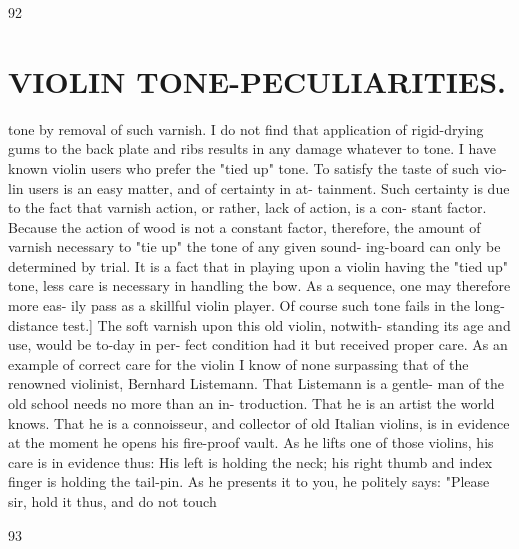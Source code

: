 \documentclass{article}
\begin{document}
92

\section*{VIOLIN TONE-PECULIARITIES.}
tone by removal of such varnish. I do not find that application of rigid-drying gums to the back plate and ribs results in any damage whatever to tone. I have known violin users who prefer the "tied up" tone. To satisfy the taste of such vio- lin users is an easy matter, and of certainty in at- tainment. Such certainty is due to the fact that varnish action, or rather, lack of action, is a con- stant factor. Because the action of wood is not a constant factor, therefore, the amount of varnish necessary to "tie up" the tone of any given sound- ing-board can only be determined by trial. It is a fact that in playing upon a violin having the "tied up" tone, less care is necessary in handling the bow. As a sequence, one may therefore more eas- ily pass as a skillful violin player. Of course such tone fails in the long-distance test.] The soft varnish upon this old violin, notwith- standing its age and use, would be to-day in per- fect condition had it but received proper care. As an example of correct care for the violin I know of none surpassing that of the renowned violinist, Bernhard Listemann. That Listemann is a gentle- man of the old school needs no more than an in- troduction. That he is an artist the world knows. That he is a connoisseur, and collector of old Italian violins, is in evidence at the moment he opens his fire-proof vault. As he lifts one of those violins, his care is in evidence thus: His left is holding the neck; his right thumb and index finger is holding the tail-pin. As he presents it to you, he politely says: "Please sir, hold it thus, and do not touch

93
\end{document}
